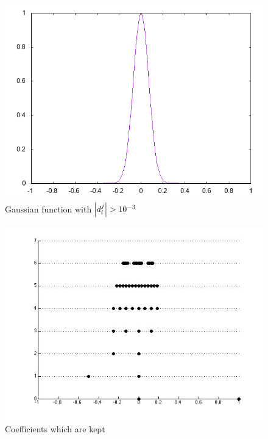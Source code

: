 \documentclass[10pt]{article}
\begin{document}
\begin{figure}
\center
\includegraphics[scale=0.7]{solution10_minus3.png}
\caption{Gaussian function with $\abs{d_{l}^{j}} > 10^{-3} $ }
\end{figure}

\begin{figure}
\center
\includegraphics[scale=0.7]{minus3_threshold.jpg}
\caption{Coefficients which are kept}
\end{figure}
\end{document}
